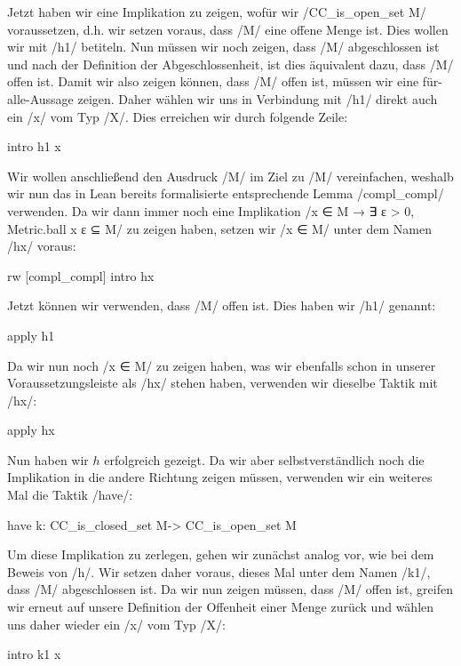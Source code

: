 \documentclass[10pt]{article}
\begin{document}
\noindent Jetzt haben wir eine Implikation zu zeigen, wofür wir \lean/CC_is_open_set M/ voraussetzen, d.h. wir setzen voraus, dass \lean/M/ eine offene Menge ist. Dies wollen wir mit \lean/h1/ betiteln. Nun müssen wir noch zeigen, dass \lean/M\compl/ abgeschlossen ist und nach der Definition der Abgeschlossenheit, ist dies äquivalent dazu, dass \lean/M\compl\compl/ offen ist. Damit wir also zeigen können, dass \lean/M\compl\compl/ offen ist, müssen wir eine für-alle-Aussage zeigen. Daher wählen wir uns in Verbindung mit \lean/h1/ direkt auch ein \lean/x/ vom Typ \lean/X/. Dies erreichen wir durch folgende Zeile:
\begin{leancode}
  intro h1 x
\end{leancode}
\noindent Wir wollen anschließend den Ausdruck \lean/M\compl\compl/ im Ziel zu \lean/M/ vereinfachen, weshalb wir nun das in Lean bereits formalisierte entsprechende Lemma \lean/compl_compl/ verwenden. Da wir dann immer noch eine Implikation \lean/x ∈ M → ∃ ε > 0, Metric.ball x ε ⊆ M/ zu zeigen haben, setzen wir \lean/x ∈ M/ unter dem Namen \lean/hx/ voraus:
\begin{leancode}
  rw [compl_compl]
  intro hx
\end{leancode}
\noindent Jetzt können wir verwenden, dass \lean/M/ offen ist. Dies haben wir \lean/h1/ genannt:
\begin{leancode}
  apply h1
\end{leancode}
\noindent Da wir nun noch \lean/x ∈ M/ zu zeigen haben, was wir ebenfalls schon in unserer Voraussetzungsleiste als \lean/hx/ stehen haben, verwenden wir dieselbe Taktik mit \lean/hx/:
\begin{leancode}
  apply hx
\end{leancode}
\noindent Nun haben wir $h$ erfolgreich gezeigt. Da wir aber selbstverständlich noch die Implikation in die andere Richtung zeigen müssen, verwenden wir ein weiteres Mal die Taktik \lean/have/:
\begin{leancode}
  have k: CC_is_closed_set M\compl -> CC_is_open_set M
\end{leancode}
\noindent Um diese Implikation zu zerlegen, gehen wir zunächst analog vor, wie bei dem Beweis von \lean/h/. Wir setzen daher voraus, dieses Mal unter dem Namen \lean/k1/, dass \lean/M\compl/ abgeschlossen ist. Da wir nun zeigen müssen, dass \lean/M/ offen ist, greifen wir erneut auf unsere Definition der Offenheit einer Menge zurück und wählen uns daher wieder ein \lean/x/ vom Typ \lean/X/:
\begin{leancode}
  intro k1 x
\end{leancode}
\end{document}
